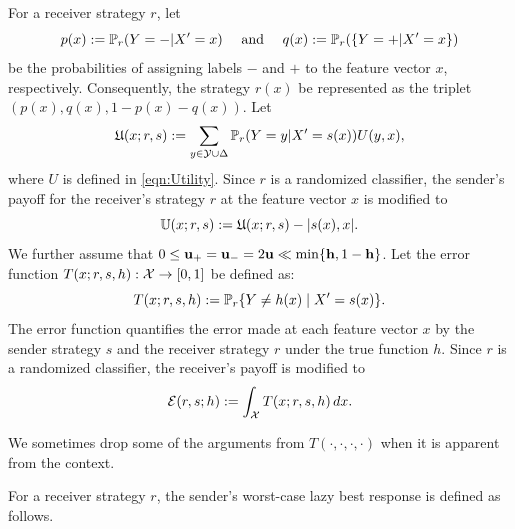 For a receiver strategy $r$, let
$$p(x) := \prob_r(Y=\minus|X'=x) \text{ and } q(x) := \prob_r(\{Y=\plus|X'=x\})$$
be the probabilities of assigning labels $-$ and $+$ to the feature vector $x$, respectively. Consequently, the strategy $r(x)$ be represented as the triplet $(p(x), q(x), 1 - p(x) - q(x))$. Let $$\mathfrak{U}(x;r,s) := \sum_{y \in \mathcal{Y}\cup \Delta}\mathbb{P}_r(Y=y|X'=s(x))U(y,x),$$ where $U$ is defined in \eqref{eqn:Utility}.
Since $r$ is a randomized classifier, the sender's payoff for the receiver's strategy $r$ at the feature vector $x$ is modified to
\begin{equation*}
	\mathbb{U}(x; r, s) := \mathfrak{U}(x;r,s)-|s(x),x|.
\end{equation*}
We further assume that $0 \leq \mathbf{u_+} = \mathbf{u_-} = 2\mathbf{u} \ll \min\{\mathbf{h},1-\mathbf{h}\}$. Let the error function $T(x; r, s, h): \mathcal{X} \to [0,1]$ be defined as:
\begin{equation}\label{eqn:error function}
    T(x; r, s, h) := \mathbb{P}_{r} \{Y\neq h(x) \mid X' = s(x)\}.
\end{equation}
The error function quantifies the error made at each feature vector $x$ by the sender strategy $s$ and the receiver strategy $r$ under the true function $h$. Since $r$ is a randomized classifier, the receiver's payoff is modified to
\begin{equation}\label{eqn:Receiver_average_error}
	\mathcal{E}(r, s; h) := \int_{\mathcal{X}} T(x; r, s, h) \, dx.
\end{equation}

\begin{notn}
    We sometimes drop some of the arguments from $T(\cdot, \cdot, \cdot, \cdot)$ when it is apparent from the context.
\end{notn}

For a receiver strategy $r$, the sender's worst-case lazy best response is defined as follows.

